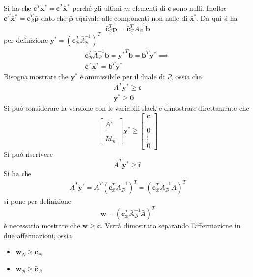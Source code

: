 \documentclass[10pt, letterpaper]{report}
\begin{document}
Si ha che $\mathbf c^T\mathbf x^*=\bar{\mathbf c}^T\bar{\mathbf x}^*$ perché gli ultimi $m$ elementi di $\mathbf c$ sono nulli. Inoltre $\bar{\mathbf c}^T\bar{\mathbf x}^*=\bar{\mathbf c}_{\mathcal B}^T\bar {\mathbf p}$ dato che $\bar {\mathbf p}$ equivale alle componenti non nulle di $\bar{\mathbf x}^*$. Da qui si ha \begin{equation}
    \bar{\mathbf c}_{\mathcal B}^T\bar {\mathbf p}=\bar{\mathbf c}_{\mathcal B}^T\bar A^{-1}_{\mathcal B}\mathbf b
\end{equation}
per definizione $ \mathbf y^*=( \bar {\mathbf c}^T_{\mathcal{B}}\bar A^{-1}_{\mathcal B})^T$\begin{eqnarray}
    \bar{\mathbf c}_{\mathcal B}^T\bar A^{-1}_{\mathcal B}\mathbf b=\mathbf {y^*}^T\mathbf b=\mathbf b ^T\mathbf y^*\implies \\ 
    \mathbf c^T\mathbf x^*=\mathbf b ^T\mathbf y^*
\end{eqnarray}
Bisogna mostrare che $\mathbf y^*$ è ammissibile per il duale di $P$, ossia che \begin{eqnarray*}
    A^T\mathbf y^*\ge \mathbf c\\ 
    \mathbf y^*\ge \mathbf 0
\end{eqnarray*}
Si può considerare la versione con le variabili slack e dimostrare direttamente che \begin{equation*}
    \begin{bmatrix}
        A^T\\ \_ \\ \\Id_m
    \end{bmatrix}\mathbf y^* \ge \begin{bmatrix}
        \mathbf c \\ \_ \\ \\ 0 \\ \vdots \\ 0
    \end{bmatrix}
\end{equation*}
Si può riscrivere $$ \bar A^T\mathbf y^* \ge \bar{\mathbf c} $$
Si ha che \begin{eqnarray*}
    \bar A^T\mathbf y^*=\bar A^T( \bar {\mathbf c}^T_{\mathcal{B}}\bar A^{-1}_{\mathcal B})^T=( \bar {\mathbf c}^T_{\mathcal{B}}\bar A^{-1}_{\mathcal B}\bar A)^T
\end{eqnarray*}
si pone per definizione 
$$ \mathbf w = ( \bar {\mathbf c}^T_{\mathcal{B}}\bar A^{-1}_{\mathcal B}\bar A)^T$$
è necessario mostrare che $\mathbf w \ge \bar{\mathbf c}$. Verrà dimostrato separando l'affermazione in due affermazioni, ossia \begin{itemize}
    \item  $\mathbf w_N \ge \bar{\mathbf c}_N$ 
    \item  $\mathbf w_{\mathcal B} \ge \bar{\mathbf c}_{\mathcal B}$
\end{itemize}
\end{document}
